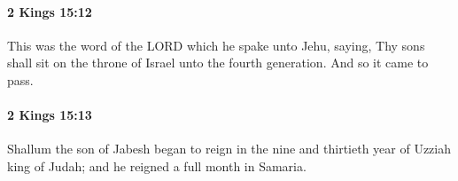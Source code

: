 		\paragraph{2 Kings 15:12} %
			\label{2KINGS-15-12}

			This was the word of the LORD which he spake unto Jehu, saying, Thy sons shall sit on the throne of Israel unto the fourth generation. And so it came to pass.


		\paragraph{2 Kings 15:13} %
			\label{2KINGS-15-13}

			Shallum the son of Jabesh began to reign in the nine and thirtieth year of Uzziah king of Judah; and he reigned a full month in Samaria.


